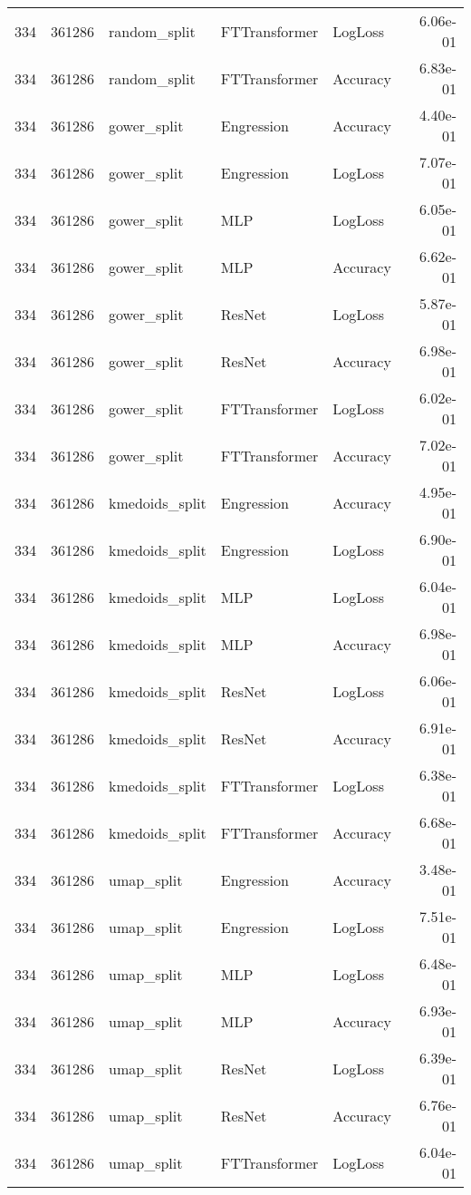 \begin{tabular}{rrlllr}
334 & 361286 & random\_split & FTTransformer & LogLoss & 6.06e-01 \\
334 & 361286 & random\_split & FTTransformer & Accuracy & 6.83e-01 \\
334 & 361286 & gower\_split & Engression & Accuracy & 4.40e-01 \\
334 & 361286 & gower\_split & Engression & LogLoss & 7.07e-01 \\
334 & 361286 & gower\_split & MLP & LogLoss & 6.05e-01 \\
334 & 361286 & gower\_split & MLP & Accuracy & 6.62e-01 \\
334 & 361286 & gower\_split & ResNet & LogLoss & 5.87e-01 \\
334 & 361286 & gower\_split & ResNet & Accuracy & 6.98e-01 \\
334 & 361286 & gower\_split & FTTransformer & LogLoss & 6.02e-01 \\
334 & 361286 & gower\_split & FTTransformer & Accuracy & 7.02e-01 \\
334 & 361286 & kmedoids\_split & Engression & Accuracy & 4.95e-01 \\
334 & 361286 & kmedoids\_split & Engression & LogLoss & 6.90e-01 \\
334 & 361286 & kmedoids\_split & MLP & LogLoss & 6.04e-01 \\
334 & 361286 & kmedoids\_split & MLP & Accuracy & 6.98e-01 \\
334 & 361286 & kmedoids\_split & ResNet & LogLoss & 6.06e-01 \\
334 & 361286 & kmedoids\_split & ResNet & Accuracy & 6.91e-01 \\
334 & 361286 & kmedoids\_split & FTTransformer & LogLoss & 6.38e-01 \\
334 & 361286 & kmedoids\_split & FTTransformer & Accuracy & 6.68e-01 \\
334 & 361286 & umap\_split & Engression & Accuracy & 3.48e-01 \\
334 & 361286 & umap\_split & Engression & LogLoss & 7.51e-01 \\
334 & 361286 & umap\_split & MLP & LogLoss & 6.48e-01 \\
334 & 361286 & umap\_split & MLP & Accuracy & 6.93e-01 \\
334 & 361286 & umap\_split & ResNet & LogLoss & 6.39e-01 \\
334 & 361286 & umap\_split & ResNet & Accuracy & 6.76e-01 \\
334 & 361286 & umap\_split & FTTransformer & LogLoss & 6.04e-01 \\

\end{tabular}
